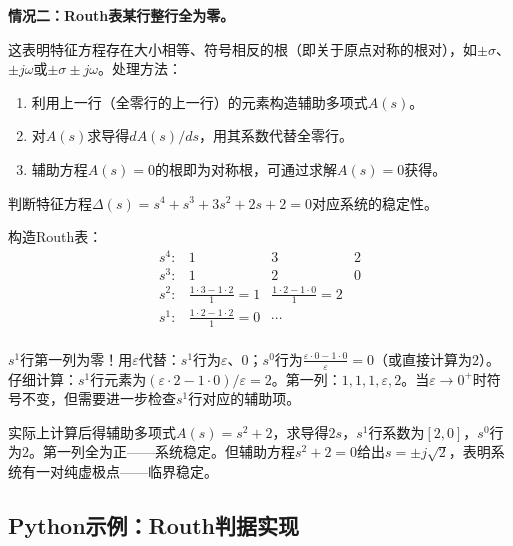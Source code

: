 \textbf{情况二：Routh表某行整行全为零。}

这表明特征方程存在大小相等、符号相反的根（即关于原点对称的根对），如$\pm\sigma$、$\pm j\omega$或$\pm\sigma\pm j\omega$。处理方法：
\begin{enumerate}
\item 利用上一行（全零行的上一行）的元素构造辅助多项式$A(s)$。
\item 对$A(s)$求导得$dA(s)/ds$，用其系数代替全零行。
\item 辅助方程$A(s)=0$的根即为对称根，可通过求解$A(s)=0$获得。
\end{enumerate}

\begin{example}
判断特征方程$\Delta(s) = s^4 + s^3 + 3s^2 + 2s + 2 = 0$对应系统的稳定性。

构造Routh表：
\[
\begin{array}{c|ccc}
s^4: & 1 & 3 & 2 \\
s^3: & 1 & 2 & 0 \\
s^2: & \frac{1\cdot 3 - 1\cdot 2}{1}=1 & \frac{1\cdot 2 - 1\cdot 0}{1}=2 & \\
s^1: & \frac{1\cdot 2 - 1\cdot 2}{1}=0 & \cdots & \\
\end{array}
\]

$s^1$行第一列为零！用$\varepsilon$代替：$s^1$行为$\varepsilon$、$0$；$s^0$行为$\frac{\varepsilon\cdot 0 - 1\cdot 0}{\varepsilon}=0$（或直接计算为$2$）。仔细计算：$s^1$行元素为$(\varepsilon \cdot 2 - 1\cdot 0)/\varepsilon = 2$。第一列：$1,1,1,\varepsilon,2$。当$\varepsilon \to 0^+$时符号不变，但需要进一步检查$s^1$行对应的辅助项。

实际上计算后得辅助多项式$A(s)=s^2+2$，求导得$2s$，$s^1$行系数为$[2,0]$，$s^0$行为$2$。第一列全为正——系统稳定。但辅助方程$s^2+2=0$给出$s=\pm j\sqrt{2}$，表明系统有一对纯虚极点——临界稳定。
\end{example}

\subsection*{Python示例：Routh判据实现}

